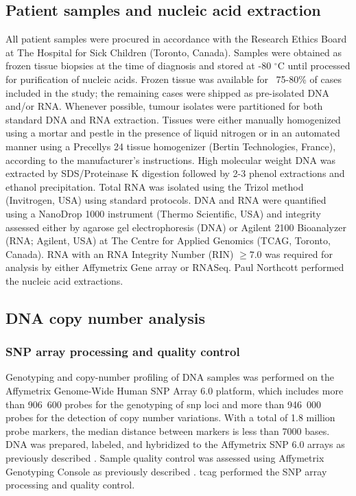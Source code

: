 \subsection{Patient samples and nucleic acid extraction}

All patient samples were procured in accordance with the Research Ethics Board at The Hospital for Sick Children (Toronto, Canada). Samples were obtained as frozen tissue biopsies at the time of diagnosis and stored at -80 $^{\circ}$C until processed for purification of nucleic acids. Frozen tissue was available for ~75-80\% of cases included in the study; the remaining cases were shipped as pre-isolated DNA and/or RNA.
Whenever possible, tumour isolates were partitioned for both standard DNA and RNA extraction. Tissues were either manually homogenized using a mortar and pestle in the presence of liquid nitrogen or in an automated manner using a Precellys 24 tissue homogenizer (Bertin Technologies, France), according to the manufacturer’s instructions. High molecular weight DNA was extracted by SDS/Proteinase K digestion followed by 2-3 phenol extractions and ethanol precipitation. Total RNA was isolated using the Trizol method (Invitrogen, USA) using standard protocols. DNA and RNA were quantified using a NanoDrop 1000 instrument (Thermo Scientific, USA) and integrity assessed either by agarose gel electrophoresis (DNA) or Agilent 2100 Bioanalyzer (RNA; Agilent, USA) at The Centre for Applied Genomics (TCAG, Toronto, Canada). RNA with an RNA Integrity Number (RIN) $\ge 7.0$ was required for analysis by either Affymetrix Gene array or RNASeq. Paul Northcott performed the nucleic acid extractions.

\subsection{DNA copy number analysis}

\subsubsection{SNP array processing and quality control}

Genotyping and copy-number profiling of DNA samples was performed on the Affymetrix Genome-Wide Human SNP Array 6.0 platform, which includes more than 906~600 probes for the genotyping of \gls{snp} loci and more than 946~000 probes for the detection of copy number variations. With a total of 1.8 million probe markers, the median distance between markers is less than 7000 bases. DNA was prepared, labeled, and hybridized to the Affymetrix SNP 6.0 arrays as previously described . Sample quality control was assessed using Affymetrix Genotyping Console as previously described . \gls{tcag} performed the SNP array processing and quality control.

